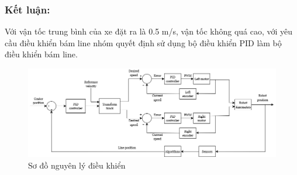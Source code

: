                 \subsubsection{Kết luận:} 
                \hspace{0.6cm}Với vận tốc trung bình của xe đặt ra là 0.5 m/s, vận tốc không quá cao, với yêu cầu điều khiển bám line nhóm quyết định sử dụng bộ điều khiển PID làm bộ điều khiển bám line.
                \begin{figure}[H]
                    \centering
                    \includegraphics[width=1.1\textwidth]{pictures/chapter2/luudodieukhien.png}
                    \caption{Sơ đồ nguyên lý điều khiển}
                    \label{control_principle}
                \end{figure}
                